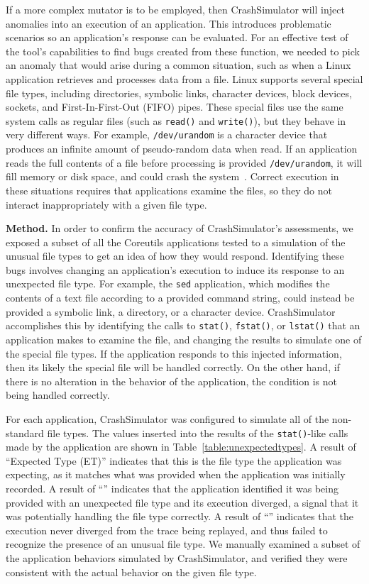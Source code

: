 If a more complex mutator is to be employed, then
CrashSimulator will inject anomalies into an execution
of an application.
This introduces problematic scenarios
so an application's response
can be evaluated.
For an effective test of the
tool's capabilities to find bugs created from these function,
we needed to pick an anomaly
that would arise during a common situation,
such as when a Linux application retrieves
and processes data from a file.
Linux supports
several special file types,
including
directories,
symbolic links,
character devices,
block devices,
sockets, and
First-In-First-Out (FIFO) pipes.
These special files
use the same system calls
as regular files
(such as {\tt read()} and {\tt write()}),
but they behave in very different ways.
For example,
{\tt /dev/urandom} is a character device
that produces an infinite amount
of pseudo-random data
when read.
If an application reads the full
contents of a file before processing is provided {\tt /dev/urandom}, it
will fill memory or disk space, and could
crash the system~\cite{YumAptEndless}.
Correct execution in these situations
requires that applications
examine the files, so they do not
interact inappropriately with a given file type.

{\bf Method.}
In order to confirm the accuracy of CrashSimulator's assessments, we
exposed a subset of all the Coreutils applications tested to
a simulation of the unusual file
types to get an idea of how they would respond.
Identifying these bugs involves changing an application's execution to induce its response to an unexpected file type. For
example, the {\tt sed} application, which modifies the contents of a text
file according to a provided command string, could instead be provided a symbolic
link, a directory, or a character device.  CrashSimulator
accomplishes this by identifying the calls to {\tt stat()}, {\tt fstat()},
or {\tt lstat()} that an application makes to examine the file, and
changing the results to simulate
one of the special file types.  If the application responds to
this injected information, then its likely the special
file will be handled correctly.  On the other hand, if there is no
alteration in the behavior of the application, the condition is not
being handled correctly.

For each application,
CrashSimulator was configured to simulate all of the non-standard file
types.  The values inserted into the results of the {\tt stat()}-like calls made by the application are shown in
Table~\ref{table:unexpectedtypes}.
A result of ``Expected Type (ET)'' indicates
that this is the file type the application was expecting, as it matches  what was provided when the application was initially recorded.
A result of ``\tickmark'' indicates that the application
identified it was being provided with an unexpected file type and its
execution diverged, a signal that it was potentially handling the
file type correctly.
A result of ``\xmark'' indicates that the execution never diverged from the trace being replayed, and thus failed to recognize the presence of an unusual file type. We manually examined a subset of the  application behaviors simulated by
CrashSimulator, and verified they were consistent with the actual behavior
on the given file type.

